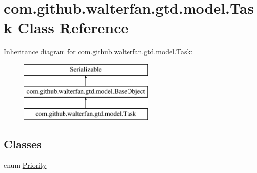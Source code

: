 \hypertarget{classcom_1_1github_1_1walterfan_1_1gtd_1_1model_1_1Task}{\section{com.\-github.\-walterfan.\-gtd.\-model.\-Task Class Reference}
\label{classcom_1_1github_1_1walterfan_1_1gtd_1_1model_1_1Task}
}
Inheritance diagram for com.\-github.\-walterfan.\-gtd.\-model.\-Task\-:\begin{figure}[H]
\begin{center}
\leavevmode
\includegraphics[height=3.000000cm]{classcom_1_1github_1_1walterfan_1_1gtd_1_1model_1_1Task}
\end{center}
\end{figure}
\subsection*{Classes}
\begin{DoxyCompactItemize}
\item 
enum \hyperlink{enumcom_1_1github_1_1walterfan_1_1gtd_1_1model_1_1Task_1_1Priority}{Priority}
\end{DoxyCompactItemize}

